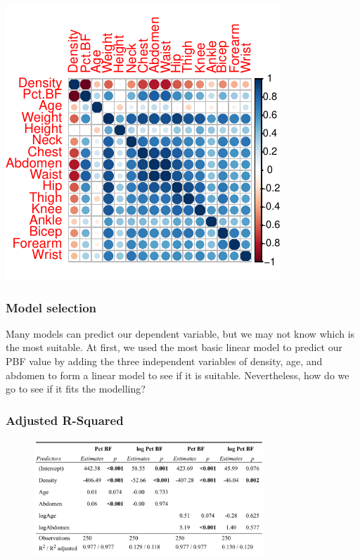 \documentclass[letterpaper,9pt,twocolumn,twoside,]{pinp}
\begin{document}
\begin{center}\includegraphics{DATA2002-RE03E1_files/figure-latex/unnamed-chunk-4-1} \end{center}

\hypertarget{model-selection}{%
\subsubsection{Model selection}\label{model-selection}}

Many models can predict our dependent variable, but we may not know
which is the most suitable. At first, we used the most basic linear
model to predict our PBF value by adding the three independent variables
of density, age, and abdomen to form a linear model to see if it is
suitable. Nevertheless, how do we go to see if it fits the modelling?

\hypertarget{adjusted-r-squared}{%
\subsubsection{Adjusted R-Squared}\label{adjusted-r-squared}}

\begin{figure}[hbt!]
  \includegraphics[width=3.43in, height=1.7in]{abc} 
\end{figure}
\end{document}
